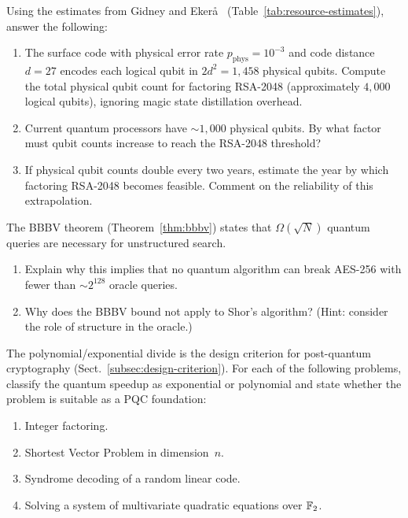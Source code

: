 \begin{prob}
\label{prob:ch04-resources}
Using the estimates from Gidney and Eker\aa{}~\cite{GidneyEkera2021} (Table~\ref{tab:resource-estimates}), answer the following:
\begin{enumerate}
\item[(a)] The surface code with physical error rate $p_\text{phys} = 10^{-3}$ and code distance $d = 27$ encodes each logical qubit in $2d^2 = 1{,}458$ physical qubits.  Compute the total physical qubit count for factoring RSA-2048 (approximately $4{,}000$ logical qubits), ignoring magic state distillation overhead.
\item[(b)] Current quantum processors have $\sim 1{,}000$ physical qubits.  By what factor must qubit counts increase to reach the RSA-2048 threshold?
\item[(c)] If physical qubit counts double every two years, estimate the year by which factoring RSA-2048 becomes feasible.  Comment on the reliability of this extrapolation.
\end{enumerate}
\end{prob}

\begin{prob}
\label{prob:ch04-bbbv}
The BBBV theorem (Theorem~\ref{thm:bbbv}) states that $\Omega(\sqrt{N})$ quantum queries are necessary for unstructured search.
\begin{enumerate}
\item[(a)] Explain why this implies that no quantum algorithm can break AES-256 with fewer than $\sim 2^{128}$ oracle queries.
\item[(b)] Why does the BBBV bound not apply to Shor's algorithm?  (Hint: consider the role of structure in the oracle.)
\end{enumerate}
\end{prob}

\begin{prob}
\label{prob:ch04-divide}
The polynomial/exponential divide is the design criterion for post-quantum cryptography (Sect.~\ref{subsec:design-criterion}).  For each of the following problems, classify the quantum speedup as exponential or polynomial and state whether the problem is suitable as a PQC foundation:
\begin{enumerate}
\item[(a)] Integer factoring.
\item[(b)] Shortest Vector Problem in dimension~$n$.
\item[(c)] Syndrome decoding of a random linear code.
\item[(d)] Solving a system of multivariate quadratic equations over $\mathbb{F}_2$.
\end{enumerate}
\end{prob}
